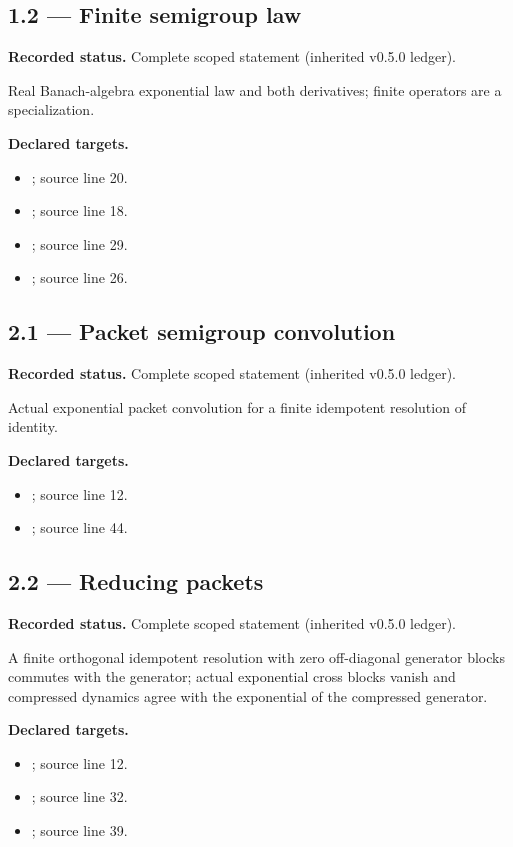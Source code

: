 \subsection{1.2 — Finite semigroup law}
\label{result:1.2}
\textbf{Recorded status.} Complete scoped statement (inherited v0.5.0 ledger).\par
Real Banach-algebra exponential law and both derivatives; finite operators are a specialization.

\textbf{Declared targets.}\begin{itemize}
\item {}; source line 20.
\item {}; source line 18.
\item {}; source line 29.
\item {}; source line 26.
\end{itemize}
\subsection{2.1 — Packet semigroup convolution}
\label{result:2.1}
\textbf{Recorded status.} Complete scoped statement (inherited v0.5.0 ledger).\par
Actual exponential packet convolution for a finite idempotent resolution of identity.

\textbf{Declared targets.}\begin{itemize}
\item {}; source line 12.
\item {}; source line 44.
\end{itemize}
\subsection{2.2 — Reducing packets}
\label{result:2.2}
\textbf{Recorded status.} Complete scoped statement (inherited v0.5.0 ledger).\par
A finite orthogonal idempotent resolution with zero off-diagonal generator blocks commutes with the generator; actual exponential cross blocks vanish and compressed dynamics agree with the exponential of the compressed generator.

\textbf{Declared targets.}\begin{itemize}
\item {}; source line 12.
\item {}; source line 32.
\item {}; source line 39.
\end{itemize}
